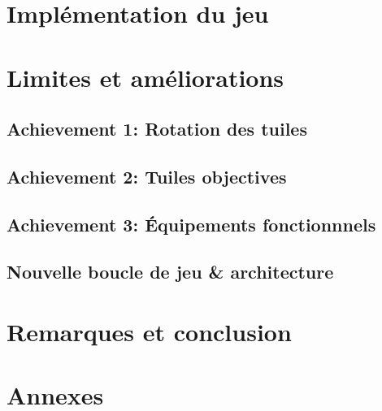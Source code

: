 \documentclass[12pt]{article}
\begin{document}


\section{Implémentation du jeu}\label{sec:3}



\section{Limites et améliorations}\label{sec:4}



\subsection{Achievement 1: Rotation des tuiles}


\subsection{Achievement 2: Tuiles objectives}



\subsection{Achievement 3: \'Equipements fonctionnnels}


\subsection{Nouvelle boucle de jeu \& architecture}


\section*{Remarques et conclusion}\label{sec:conclusion}


\section*{Annexes}

\end{document}
